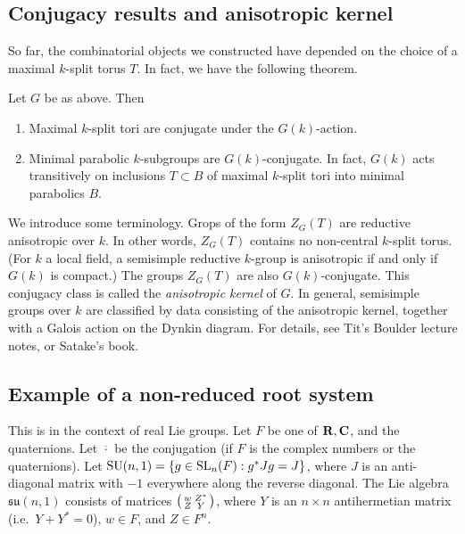 \documentclass{article}
\begin{document}
\subsection{Conjugacy results and anisotropic kernel}

So far, the combinatorial objects we constructed have depended on the choice of 
a maximal $k$-split torus $T$. In fact, we have the following theorem. 

\begin{theorem}
Let $G$ be as above. Then 
\begin{enumerate}
  \item Maximal $k$-split tori are conjugate under the $G(k)$-action. 
  \item Minimal parabolic $k$-subgroups are $G(k)$-conjugate. In fact, 
    $G(k)$ acts transitively on inclusions $T\subset B$ of maximal $k$-split 
    tori into minimal parabolics $B$. 
\end{enumerate}
\end{theorem}

We introduce some terminology. Grops of the form $Z_G(T)$ are reductive anisotropic 
over $k$. In other words, $Z_G(T)$ contains no non-central $k$-split torus. (For 
$k$ a local field, a semisimple 
reductive $k$-group is anisotropic if and only if $G(k)$ is compact.) The groups 
$Z_G(T)$ are also $G(k)$-conjugate. This conjugacy class is called the 
\emph{anisotropic kernel} of $G$. In general, semisimple groups over $k$ are 
classified by data consisting of the anisotropic kernel, together with a 
Galois action on the Dynkin diagram. For details, see Tit's Boulder lecture 
notes, or Satake's book. 


\subsection{Example of a non-reduced root system}

This is in the context of real Lie groups. Let $F$ be one of $\mathbf{R},\mathbf{C}$, and 
the quaternions. Let $\overline{\cdot}$ be the conjugation (if $F$ is the 
complex numbers or the quaternions). Let 
$\operatorname{SU}(n,1) = \{g\in \operatorname{SL}_n(F):g^\ast J g=J\}$, where 
$J$ is an anti-diagonal matrix with $-1$ everywhere along the reverse 
diagonal. The Lie algebra $\mathfrak{su}(n,1)$ consists of matrices 
$\bigl(\begin{smallmatrix} w & Z^\ast \\ Z & Y \end{smallmatrix} \bigr)$, where $Y$ is an $n\times n$ antihermetian matrix 
(i.e.\ $Y+Y^\ast=0$), $w\in F$, and $Z\in F^n$. 
\end{document}
